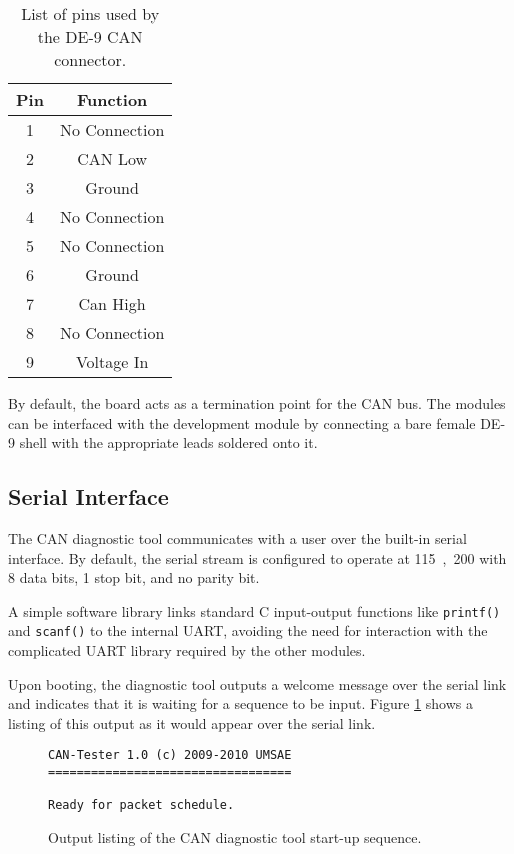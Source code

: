\begin{table}[H]
  \caption{List of pins used by the DE-9 CAN connector.}
  \centering
  \begin{tabular}{|c|c|}
    \hline 
    Pin & Function \\
    \hline \hline
    1 & No Connection\\
    \hline    
    2 & CAN Low\\
    \hline    
    3 & Ground\\
    \hline    
    4 & No Connection\\
    \hline    
    5 & No Connection\\
    \hline    
    6 & Ground\\
    \hline    
    7 & Can High\\                 
    \hline    
    8 & No Connection\\
    \hline
    9 & Voltage In\\        
    \hline
  \end{tabular}
  \label{tbl:candt_pins}
\end{table}

By default, the board acts as a termination point for the CAN bus. The modules can be interfaced with the development module by connecting a bare female DE-9 shell with the appropriate leads soldered onto it. 

\subsection{Serial Interface}

The CAN diagnostic tool communicates with a user over the built-in serial interface. By default, the serial stream is configured to operate at \unit{115,200}{\kilo\bit\per\second} with 8 data bits, 1 stop bit, and no parity bit.

A simple software library links standard C input-output functions like \verb|printf()| and \verb|scanf()| to the internal UART, avoiding the need for interaction with the complicated UART library required by the other modules. 

Upon booting, the diagnostic tool outputs a welcome message over the serial link and indicates that it is waiting for a sequence to be input. Figure \ref{fig:candt_startup} shows a listing of this output as it would appear over the serial link.

\begin{figure}[H]
	\centering
	\makebox[\textwidth]{\hrulefill}
{\footnotesize	
	\begin{verbatim}
CAN-Tester 1.0 (c) 2009-2010 UMSAE
==================================

Ready for packet schedule.
	\end{verbatim}
}	
	\makebox[\textwidth]{\hrulefill}
	\caption{Output listing of the CAN diagnostic tool start-up sequence.}
	\label{fig:candt_startup}
\end{figure}

